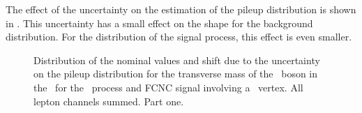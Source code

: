 The effect of the uncertainty on the estimation of the pileup distribution is shown in . This uncertainty has a small effect on the shape for the background distribution. For the distribution of the signal process, this effect is even smaller. 
\begin{figure}[htbp] 
	\centering 
	\caption{Distribution of the nominal values and shift due to  the uncertainty on the pileup distribution for the transverse mass of the \PW\ boson in the \STSR\ for the \WZ\ process and FCNC signal involving a \Zut\ vertex. All lepton channels summed. Part one.}
\label{fig:shiftBDTSTZutPU}
\end{figure}

